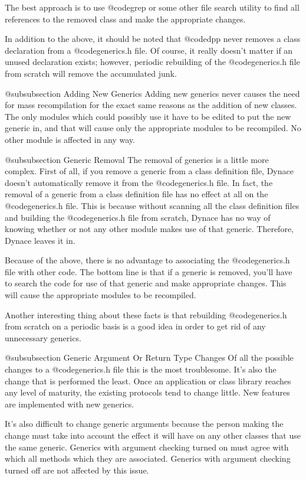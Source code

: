 The best approach is to use @code{grep} or some other file search utility
to find all references to the removed class and make the appropriate
changes.

In addition to the above, it should be noted that @code{dpp} never
removes a class declaration from a @code{generics.h} file.  Of
course, it really doesn't matter if an unused declaration exists;
however, periodic rebuilding of the @code{generics.h} file
from scratch will remove the accumulated junk.

@subsubsection Adding New Generics
Adding new generics never causes the need for mass recompilation for the
exact same reasons as the addition of new classes.  The only modules
which could possibly use it have to be edited to put the new generic in,
and that will cause only the appropriate modules to be recompiled.
No other module is affected in any way.

@subsubsection Generic Removal
The removal of generics is a little more complex.  First of all,
if you remove a generic from a class definition file, Dynace
doesn't automatically remove it from the @code{generics.h} file.
In fact, the removal of a generic from a class definition file
has no effect at all on the @code{generics.h} file.  This is because
without scanning all the class definition files and building the
@code{generics.h} file from scratch, Dynace has no way of knowing
whether or not any other module makes use of that generic.
Therefore, Dynace leaves it in.

Because of the above, there is no advantage to associating the
@code{generics.h} file with other code.  The bottom line is that
if a generic is removed, you'll have to search the code for
use of that generic and make appropriate changes.  This will
cause the appropriate modules to be recompiled.

Another interesting thing about these facts is that rebuilding
@code{generics.h} from scratch on a periodic basis is a good idea in
order to get rid of any unnecessary generics.

@subsubsection Generic Argument Or Return Type Changes
Of all the possible changes to a @code{generics.h} file this is the
most troublesome.  It's also the change that is performed
the least.  Once an application or class library reaches any level
of maturity, the existing protocols tend to change little.  New
features are implemented with new generics.

It's also difficult to change generic arguments because
the person making the change must take into account the effect it will
have on any other classes that use the same generic.  Generics with
argument checking turned on must agree with which all methods which they are
associated.  Generics with argument checking turned off are not
affected by this issue.


